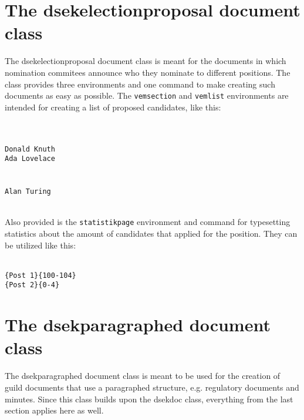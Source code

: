 \documentclass[a4paper, oneside]{ltxdoc}
\begin{document}
\section{The \textsf{dsekelectionproposal} document class}
The \textsf{dsekelectionproposal} document class is meant for the documents in
which nomination commitees announce who they nominate to different positions.
The class provides three environments and one command to make creating such
documents as easy as possible.  The \texttt{vemsection} and \texttt{vemlist}
environments are intended for creating a list of proposed candidates, like this:

\begin{center}
  \begin{minipage}{0.4\linewidth}
            \\
     \\
     \texttt{Donald Knuth} \\
     \texttt{Ada Lovelace} \\
                 \\
     \\
     \texttt{Alan Turing}  \\
                 \\
  \end{minipage}
\end{center}

Also provided is the \texttt{statistikpage} environment and 
command for typesetting statistics about the amount of candidates that applied
for the position.  They can be utilized like this:

\begin{center}
  \begin{minipage}{0.4\linewidth}
         \\
    \texttt{\{Post 1\}\{100-104\}} \\
    \texttt{\{Post 2\}\{0-4\}} \\
  \end{minipage}
\end{center}

\section{The \textsf{dsekparagraphed} document class}
The \textsf{dsekparagraphed} document class is meant to be used for the creation
of guild documents that use a paragraphed structure, e.g. regulatory documents
and minutes.  Since this class builds upon the \textsf{dsekdoc} class,
everything from the last section applies here as well.
\end{document}
